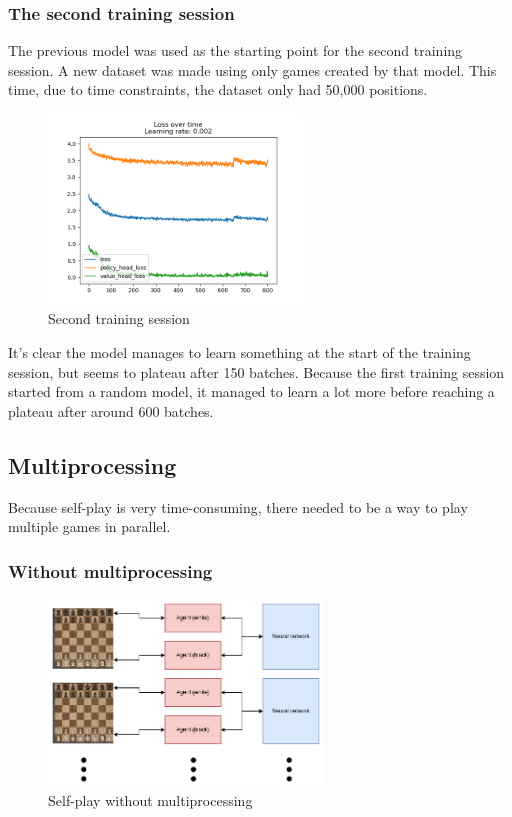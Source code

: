 \documentclass{article}
\begin{document}
\subsubsection{The second training session}

The previous model was used as the starting point for the second training session.
A new dataset was made using only games created by that model. 
This time, due to time constraints, the dataset only had 50,000 positions.

\begin{figure}[H]
    \centering
    \includegraphics[width=0.6\textwidth]{img/second-training.png}
    \caption{Second training session}
\end{figure}

It's clear the model manages to learn something at the start of the training session,
but seems to plateau after 150 batches. Because the first training session started from 
a random model, it managed to learn a lot more before reaching a plateau after around 600 batches.

\subsection{Multiprocessing}

Because self-play is very time-consuming, there needed to be a way to play multiple games in parallel.

\subsubsection{Without multiprocessing}

\begin{figure}[H]
    \centering
    \includegraphics[width=0.65\textwidth]{img/without-multiprocessing.png}
    \caption{Self-play without multiprocessing}
\end{figure}
\end{document}
